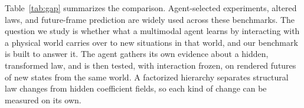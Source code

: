 Table~\ref{tab:gap} summarizes the comparison. Agent-selected experiments, altered laws, and future-frame prediction are widely used across these benchmarks. The question we study is whether what a multimodal agent learns by interacting with a physical world carries over to new situations in that world, and our benchmark is built to answer it. The agent gathers its own evidence about a hidden, transformed law, and is then tested, with interaction frozen, on rendered futures of new states from the same world. A factorized hierarchy separates structural law changes from hidden coefficient fields, so each kind of change can be measured on its own.
